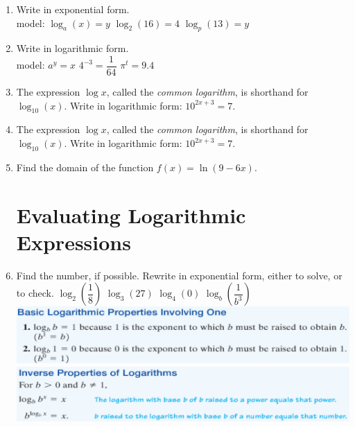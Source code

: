 \documentclass[11pt]{article}
\begin{document}
\begin{enumerate}
\item Write in exponential form.  \\
model: $\log_a(x)=y$ \hspace{1in} $\log_2 (16) = 4$ \hspace{1in} $\log_p (13) = y$\\[1in]

\item Write in logarithmic form. \\
model: $a^y = x$  \hspace{1in} $4^{-3} = \dfrac{1}{64}$ \hspace{1in} $\pi^t = 9.4$ \\[.5in]


\item The expression $\log x$, called the \emph{common logarithm}, is shorthand for $\log_{10}(x)$. Write in logarithmic form: $10^{2x+3} = 7$. \\[.5in]


\item The expression $\log x$, called the \emph{common logarithm}, is shorthand for $\log_{10}(x)$. Write in logarithmic form: $10^{2x+3} = 7$. \\[.5in]

\item Find the domain of the function $f(x) = \ln (9-6x)$. \\[.8in]



\section{Evaluating Logarithmic Expressions}
\item Find the number, if possible. Rewrite in exponential form, either to solve, or to check.
$\log_2 \left(  \dfrac{1}{8} \right)$  \hspace{1in} $\log_3 (27)$  \hspace{1in} $\log_4(0)$   \hspace{1in} $\log_b\left(\dfrac{1}{b^3}\right)$ \\[1in]




\includegraphics[scale=.9]{logprop1}
\includegraphics[scale=.9]{logprop2}


\end{enumerate}
\end{document}
